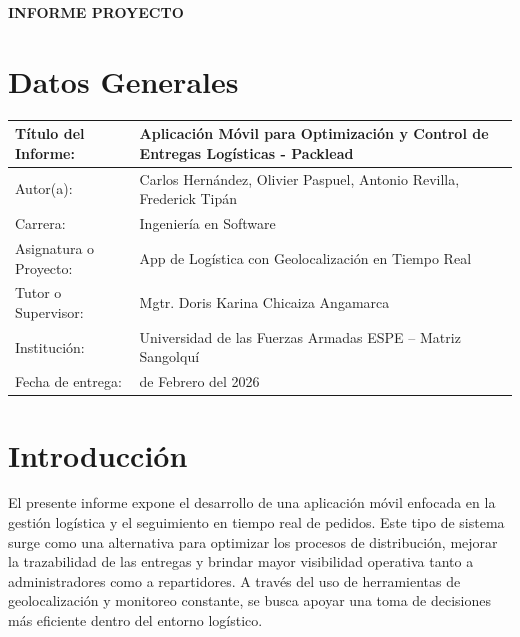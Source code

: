 \documentclass[11pt,letterpaper]{article}
\begin{document}
\renewcommand{\figurename}{Ilustración} 
{\textbf{\textcolor{azulOscuro}{INFORME PROYECTO}}}


{\setlength{\parskip}{0pt}
\section{Datos Generales}
}

\begin{tabularx}{\textwidth}{|>{\raggedright\arraybackslash}X|>{\raggedright\arraybackslash}X|}
\hline
Título del Informe: &  Aplicación Móvil para Optimización y Control de Entregas Logísticas - Packlead \\
\hline
Autor(a): & Carlos Hernández, Olivier Paspuel, Antonio Revilla, Frederick Tipán\\
\hline
Carrera: & Ingeniería en Software \\
\hline
Asignatura o Proyecto: & App de Logística con Geolocalización en Tiempo Real \\
\hline
Tutor o Supervisor: & Mgtr. Doris Karina Chicaiza Angamarca\\
\hline
Institución: & Universidad de las Fuerzas Armadas ESPE – Matriz Sangolquí \\
\hline
Fecha de entrega: & 10 de Febrero del 2026 \\
\hline
\end{tabularx}



\section{Introducción}
El presente informe expone el desarrollo de una aplicación móvil enfocada en la gestión logística y el seguimiento en tiempo real de pedidos. Este tipo de sistema surge como una alternativa para optimizar los procesos de distribución, mejorar la trazabilidad de las entregas y brindar mayor visibilidad operativa tanto a administradores como a repartidores. A través del uso de herramientas de geolocalización y monitoreo constante, se busca apoyar una toma de decisiones más eficiente dentro del entorno logístico.
\end{document}
